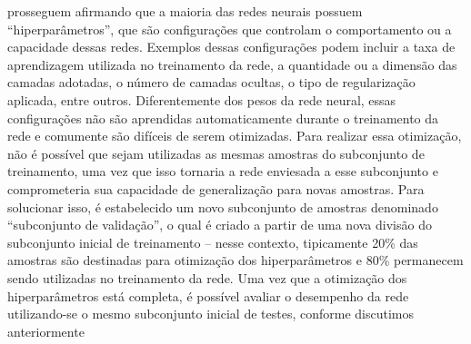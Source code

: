 
 prosseguem afirmando que a maioria das redes neurais possuem ``hiperparâmetros'', que são configurações que controlam o comportamento ou a capacidade dessas redes. Exemplos dessas configurações podem incluir a taxa de aprendizagem utilizada no treinamento da rede, a quantidade ou a dimensão das camadas adotadas, o número de camadas ocultas, o tipo de regularização aplicada, entre outros. 
Diferentemente dos pesos da rede neural, essas configurações não são aprendidas automaticamente durante o treinamento da rede e comumente são difíceis de serem otimizadas.
Para realizar essa otimização, não é possível que sejam utilizadas as mesmas amostras do subconjunto de treinamento, uma vez que isso tornaria a rede enviesada a esse subconjunto e comprometeria sua capacidade de generalização para novas amostras.
Para solucionar isso, é estabelecido um novo subconjunto de amostras denominado ``subconjunto de validação'', o qual é criado a partir de uma nova divisão do subconjunto inicial de treinamento -- nesse contexto, tipicamente 20\% das amostras são destinadas para otimização dos hiperparâmetros e 80\% permanecem sendo utilizadas no treinamento da rede.
Uma vez que a otimização dos hiperparâmetros está completa, é possível avaliar o desempenho da rede utilizando-se o mesmo subconjunto inicial de testes, conforme discutimos anteriormente







